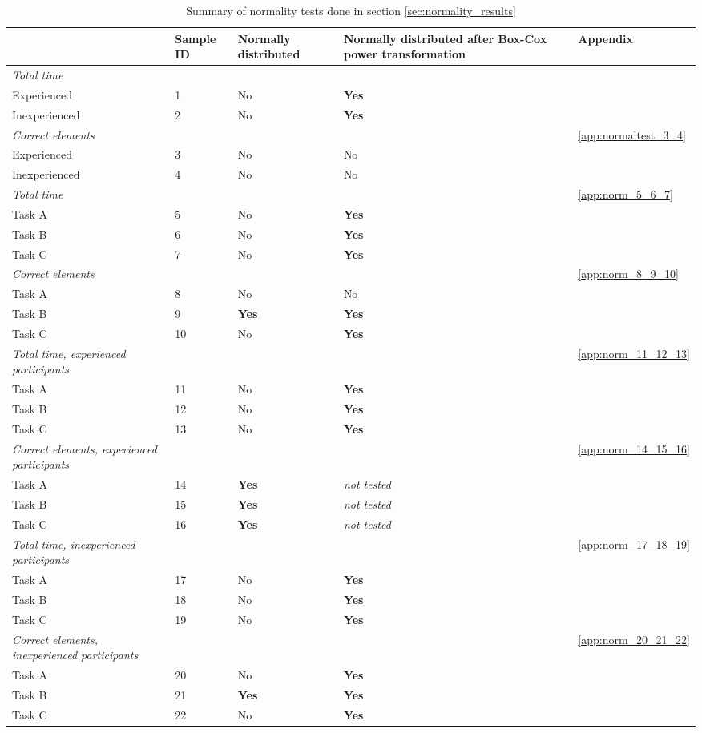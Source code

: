 	\begin{longtable}{p{}|l|p{2cm}|p{}|p{}}
	\caption[Summary, normality tests]{Summary of normality tests done in section \ref{sec:normality_results}} \label{tab:normaltest_summary} \\
		  & Sample ID & Normally distributed  & Normally distributed after Box-Cox power transformation & Appendix \\ \hline
		\textit{Total time} & & & &\\
		Experienced & 1 &No   & \textbf{Yes}  & \\
		Inexperienced  & 2 & No & \textbf{Yes}  &   \\ \hline
		\textit{Correct elements} & & & & \ref{app:normaltest_3_4}\\
		Experienced & 3 & No  & No &  \\
		Inexperienced  & 4 & No & No &  \\ \hline
		\textit{Total time }& & & & \ref{app:norm_5_6_7}\\
		Task A & 5 &No  & \textbf{Yes} & \\
		Task B & 6 &No  & \textbf{Yes} &  \\
		Task C & 7 & No & \textbf{Yes} & \\ \hline
		\textit{Correct elements} & & & & \ref{app:norm_8_9_10}\\
		Task A & 8 & No  & No & \\
		Task B & 9 &\textbf{Yes}  & \textbf{Yes} &  \\
		Task C & 10 & No & \textbf{Yes} &  \\ \hline
		\textit{Total time, experienced participants} & & & & \ref{app:norm_11_12_13}\\
		Task A & 11 & No  & \textbf{Yes} & \\
		Task B & 12 & No  & \textbf{Yes} &  \\
		Task C & 13 & No & \textbf{Yes} & \\ \hline
		\textit{Correct elements, experienced participants} & & & & \ref{app:norm_14_15_16}\\
		Task A & 14 & \textbf{Yes}  & \textit{not tested} & \\
		Task B & 15 & \textbf{Yes}  &  \textit{not tested} & \\
		Task C & 16 & \textbf{Yes} & \textit{not tested} & \\ \hline
		\textit{Total time, inexperienced participants} & & & & \ref{app:norm_17_18_19} \\
		Task A & 17& No  & \textbf{Yes} & \\
		Task B & 18 & No  & \textbf{Yes}  & \\
		Task C & 19 & No & \textbf{Yes}  & \\ \hline
		\textit{Correct elements, inexperienced participants} & & & & \ref{app:norm_20_21_22} \\
		Task A & 20 & No  & \textbf{Yes} & \\
		Task B & 21 & \textbf{Yes}  & \textbf{Yes} & \\
		Task C & 22 & No & \textbf{Yes} & \\ \hline
	\end{longtable}

